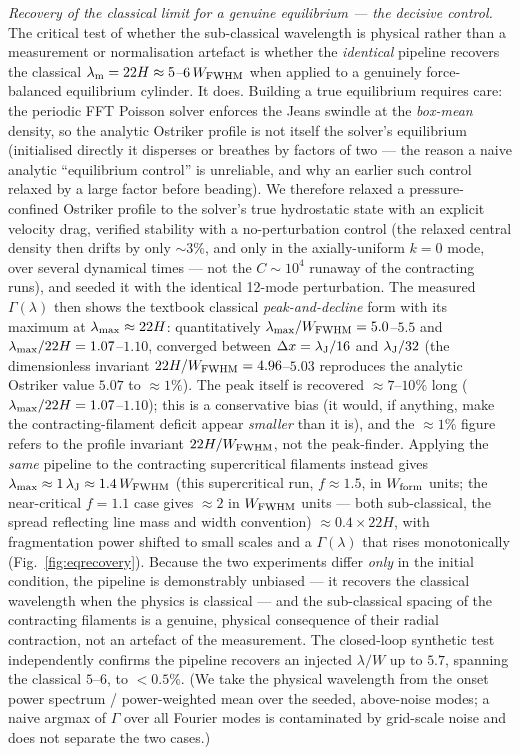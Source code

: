 \documentclass[usenatbib,twoside,twocolumn]{mnras}
\begin{document}
\emph{Recovery of the classical limit for a genuine equilibrium --- the decisive control.} The critical test of whether the sub-classical wavelength is physical rather than a measurement or normalisation artefact is whether the \emph{identical} pipeline recovers the classical $\lambda_{\rm m}=22H\approx5$--$6\,W_{\rm FWHM}$ when applied to a genuinely force-balanced equilibrium cylinder. It does. Building a true equilibrium requires care: the periodic FFT Poisson solver enforces the Jeans swindle at the \emph{box-mean} density, so the analytic Ostriker profile is not itself the solver's equilibrium (initialised directly it disperses or breathes by factors of two --- the reason a naive analytic ``equilibrium control'' is unreliable, and why an earlier such control relaxed by a large factor before beading). We therefore relaxed a pressure-confined Ostriker profile to the solver's true hydrostatic state with an explicit velocity drag, verified stability with a no-perturbation control (the relaxed central density then drifts by only $\sim3\%$, and only in the axially-uniform $k=0$ mode, over several dynamical times --- not the $C\sim10^{4}$ runaway of the contracting runs), and seeded it with the identical 12-mode perturbation. The measured $\Gamma(\lambda)$ then shows the textbook classical \emph{peak-and-decline} form with its maximum at $\lambda_{\rm max}\approx22H$: quantitatively $\lambda_{\rm max}/W_{\rm FWHM}=5.0$--$5.5$ and $\lambda_{\rm max}/22H=1.07$--$1.10$, converged between $\Delta x=\lambda_{\rm J}/16$ and $\lambda_{\rm J}/32$ (the dimensionless invariant $22H/W_{\rm FWHM}=4.96$--$5.03$ reproduces the analytic Ostriker value $5.07$ to $\approx1\%$). The peak itself is recovered $\approx7$--$10\%$ long ($\lambda_{\rm max}/22H=1.07$--$1.10$); this is a conservative bias (it would, if anything, make the contracting-filament deficit appear \emph{smaller} than it is), and the $\approx1\%$ figure refers to the profile invariant $22H/W_{\rm FWHM}$, not the peak-finder. Applying the \emph{same} pipeline to the contracting supercritical filaments instead gives $\lambda_{\rm max}\approx1\,\lambda_{\rm J}\approx1.4\,W_{\rm FWHM}$ (this supercritical run, $f\approx1.5$, in $W_{\rm form}$ units; the near-critical $f=1.1$ case gives $\approx2$ in $W_{\rm FWHM}$ units --- both sub-classical, the spread reflecting line mass and width convention) $\approx0.4\times22H$, with fragmentation power shifted to small scales and a $\Gamma(\lambda)$ that rises monotonically (Fig.~\ref{fig:eqrecovery}). Because the two experiments differ \emph{only} in the initial condition, the pipeline is demonstrably unbiased --- it recovers the classical wavelength when the physics is classical --- and the sub-classical spacing of the contracting filaments is a genuine, physical consequence of their radial contraction, not an artefact of the measurement. The closed-loop synthetic test independently confirms the pipeline recovers an injected $\lambda/W$ up to $5.7$, spanning the classical $5$--$6$, to $<0.5\%$. (We take the physical wavelength from the onset power spectrum / power-weighted mean over the seeded, above-noise modes; a naive argmax of $\Gamma$ over all Fourier modes is contaminated by grid-scale noise and does not separate the two cases.)
\end{document}

